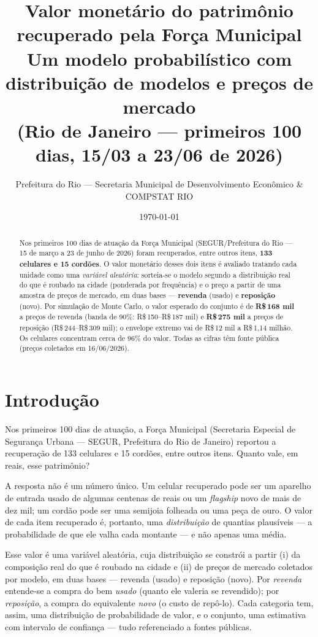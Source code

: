 \documentclass[11pt,a4paper]{article}
\title{\textbf{Valor monetário do patrimônio recuperado pela Força Municipal}\\[0.3em]
\large Um modelo probabilístico com distribuição de modelos e preços de mercado\\(Rio de Janeiro --- primeiros 100 dias, 15/03 a 23/06 de 2026)}
\author{Prefeitura do Rio --- Secretaria Municipal de Desenvolvimento Econômico \& COMPSTAT RIO}
\date{\today}
\newcommand{\reais}[1]{R\$\,#1}
\begin{document}
\maketitle

\begin{abstract}
\noindent Nos primeiros 100 dias de atuação da Força Municipal (SEGUR/Prefeitura do Rio --- 15 de
março a 23 de junho de 2026) foram recuperados, entre outros itens, \textbf{133 celulares e 15
cordões}. O valor monetário desses dois itens é avaliado tratando cada unidade como uma
\emph{variável aleatória}: sorteia-se o modelo segundo a distribuição real do que é roubado na
cidade (ponderada por frequência) e o preço a partir de uma amostra de preços de mercado, em duas
bases --- \textbf{revenda} (usado) e \textbf{reposição} (novo). Por simulação de Monte Carlo, o
valor esperado do conjunto é de \textbf{\reais{168} mil} a preços de revenda (banda de 90\%:
\reais{150}--\reais{187} mil) e \textbf{\reais{275} mil} a preços de reposição
(\reais{244}--\reais{309} mil); o envelope extremo vai de \reais{12} mil a \reais{1{,}14} milhão.
Os celulares concentram cerca de 96\% do valor. Todas as cifras têm fonte pública (preços
coletados em 16/06/2026).
\end{abstract}

\section{Introdução}
Nos primeiros 100 dias de atuação, a Força Municipal (Secretaria Especial de Segurança Urbana ---
SEGUR, Prefeitura do Rio de Janeiro) reportou a recuperação de 133 celulares e 15 cordões, entre
outros itens. Quanto vale, em reais, esse patrimônio?

A resposta não é um número único. Um celular recuperado pode ser um aparelho de entrada usado de
algumas centenas de reais ou um \emph{flagship} novo de mais de dez mil; um cordão pode ser uma
semijoia folheada ou uma peça de ouro. O valor de cada item recuperado é, portanto, uma
\emph{distribuição} de quantias plausíveis --- a probabilidade de que ele valha cada montante ---
e não apenas uma média.

Esse valor é uma variável aleatória, cuja distribuição se constrói a partir (i) da composição real
do que é roubado na cidade e (ii) de preços de mercado coletados por modelo, em duas bases ---
revenda (usado) e reposição (novo). Por \emph{revenda} entende-se a compra do bem \emph{usado}
(quanto ele valeria se revendido); por \emph{reposição}, a compra do equivalente \emph{novo} (o
custo de repô-lo). Cada categoria tem, assim, uma distribuição de probabilidade de valor, e o
conjunto, uma estimativa com intervalo de confiança --- tudo referenciado a fontes públicas.
\end{document}
